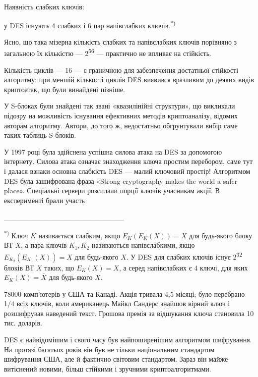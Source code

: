 {{{{{{{{{{{{{{{{{{\begin{definition}
{{{{{{{{{{{{{\liststyleWWviiiNumxlix
\beginitemize}
\item Наявність слабких ключів:
\enditemize}
 у DES існують 4 слабких і 6 пар напівслабких ключів.\textsuperscript{*)}

Ясно, що така мізерна кількість слабких та напівслабких ключів порівняно з
загальною їх кількістю --- 2\textsuperscript{56} --- практично не впливає на
стійкість. 

\liststyleWWviiiNumxlix
\beginitemize}
\item Кількість циклів --- 16 --- є граничною для забезпечення достатньої стійкості
алгоритму: при меншій кількості циклів DES виявився вразливим до деяких видів
криптоатак, що були винайдені пізніше.  
\item У S-блоках були знайдені так звані «квазилінійні структури», що викликали
підозру на можливість існування ефективних методів криптоаналізу, відомих
авторам алгоритму. Автори, до того ж, недостатньо обгрунтували вибір саме таких
таблиць S-блоків.
\enditemize}

\bigskip

У 1997 році була здійснена успішна силова атака на DES за допомогою інтернету.
Силова атака означає знаходження ключа простим перебором, саме тут і далася
взнаки основна слабкість DES --- малий ключовий простір! Алгоритмом DES\textit{
}була зашифрована фраза «Strong cryptography makes the world a safer place».
Спеціальні сервери розсилали порції ключів учасникам акції. В експерименті
брали участь 

\_\_\_\_\_\_\_\_\_\_\_\_\_\_\_\_\_\_\_\_\_\_\_

\textsuperscript{*) }Ключ  $K$ називається слабким, якщо 
$E_K(E_K(X))=X$ для будь-якого блоку ВТ  $X$, а пара ключів 
$K_1,K_2$ називаються напівслабкими, якщо 
$E_K_{{2}}(E_K_{{1}}(X))=X$ для будь-якого  $X$. У DES для слабких
ключів існує 2\textsuperscript{32}  блоків ВТ  $X$ таких, що 
$E_K(X)=X$, а серед напівслабких є 4 ключі, для яких 
$E_K(X)=\overline{X}$ для будь-якого  $X$. 

78000 комп’ютерів у США та Канаді. Акція тривала 4,5 місяці; було перебрано 1/4
всіх ключів, коли американець Майкл Сандерс знайшов вірний ключ і розшифрував
наведений текст. Грошова премія за відшукання ключа становила 10 тис. доларів.

DES є найвідомішим і свого часу був найпоширенішим алгоритмом шифрування. На
протязі багатьох років він був не тільки національним стандартом шифрування
США, але й фактично світовим стандартом. Зараз він майже витіснений новими,
більш стійкими і зручними криптоалгоритмами.


}}}}}}}}}
\end{definition}}}}}}}}}}}}}}}}}}}
